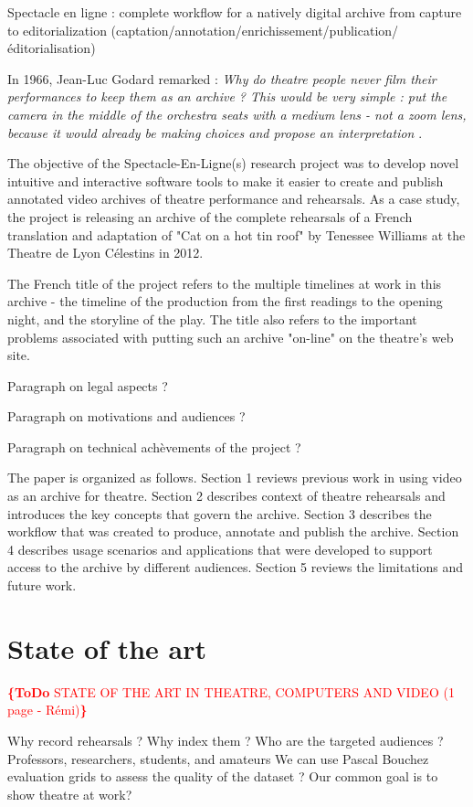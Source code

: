 \documentclass[conference]{IEEEtran}
\newcommand{\todo}[1]{\noindent\textcolor{red}{{\bf \{ToDo} #1{\bf \}}}}
\begin{document}
Spectacle en ligne : complete workflow for a natively digital archive from capture to editorialization
(captation/annotation/enrichissement/publication/éditorialisation)

In 1966, Jean-Luc Godard remarked : {\em Why do theatre people never film their performances to keep  them as an archive ? This would be very simple : put the camera in the middle of the orchestra seats with a medium lens -  not  a zoom lens, because it would already be making choices and propose an interpretation} \cite{Godard66}.

The objective of the Spectacle-En-Ligne(s) research project was to develop novel intuitive and interactive software tools to make it easier to 
create and publish annotated video archives of theatre performance and rehearsals. As a case study, the project is releasing an archive of 
the complete rehearsals of a French translation and adaptation of "Cat on a hot tin roof" by Tenessee Williams at the Theatre de Lyon Célestins
in 2012. 

The French title of the project refers to the multiple timelines at work in this archive   - the timeline of the production from the first readings to the opening night, and the storyline of the play. The title also refers to the important problems associated with putting such an archive "on-line" on the theatre's web site.

Paragraph on legal aspects ? 

Paragraph on motivations and audiences ? 

Paragraph on technical achèvements of the project ?

The paper is organized as follows. Section 1 reviews previous work in using video as an archive for theatre. Section 2 describes
context of theatre rehearsals and introduces the key concepts that govern the archive. Section 3 describes the workflow that was
created to produce, annotate and publish the archive. Section 4 describes usage scenarios and applications that were developed
to support access to the archive by different audiences. Section 5 reviews the limitations and future work.



\section{State of the art}
\todo{STATE OF THE ART IN THEATRE, COMPUTERS AND VIDEO (1 page - Rémi)}

Why record rehearsals ?
Why index them ?
Who are the targeted audiences ? Professors, researchers, students, and amateurs
We can use Pascal Bouchez evaluation grids to assess the quality of the dataset ?
Our common goal is to show theatre at work?
\end{document}
